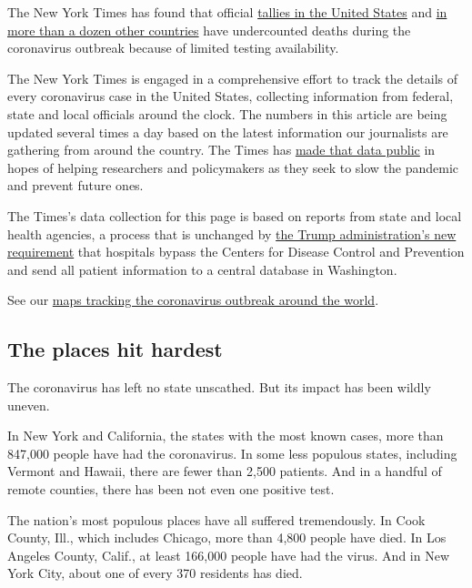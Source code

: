 The New York Times has found that official
\href{https://www.nytimes3xbfgragh.onion/interactive/2020/04/28/us/coronavirus-death-toll-total.html}{tallies
in the United States} and
\href{https://www.nytimes3xbfgragh.onion/interactive/2020/04/21/world/coronavirus-missing-deaths.html}{in
more than a dozen other countries} have undercounted deaths during the
coronavirus outbreak because of limited testing availability.

The New York Times is engaged in a comprehensive effort to track the
details of every coronavirus case in the United States, collecting
information from federal, state and local officials around the clock.
The numbers in this article are being updated several times a day based
on the latest information our journalists are gathering from around the
country. The Times has
\href{https://www.nytimes3xbfgragh.onion/article/coronavirus-county-data-us.html?action=click\&module=Spotlight\&pgtype=Homepage}{made
that data public} in hopes of helping researchers and policymakers as
they seek to slow the pandemic and prevent future ones.

The Times's data collection for this page is based on reports from state
and local health agencies, a process that is unchanged by
\href{https://www.nytimes3xbfgragh.onion/2020/07/14/us/politics/trump-cdc-coronavirus.html}{the
Trump administration's new requirement} that hospitals bypass the
Centers for Disease Control and Prevention and send all patient
information to a central database in Washington.

See our
\href{https://www.nytimes3xbfgragh.onion/interactive/2020/world/coronavirus-maps.html}{maps
tracking the coronavirus outbreak around the world}.

\hypertarget{the-places-hit-hardest}{%
\subsection{The places hit hardest}\label{the-places-hit-hardest}}

The coronavirus has left no state unscathed. But its impact has been
wildly uneven.

In New York and California, the states with the most known cases, more
than 847,000 people have had the coronavirus. In some less populous
states, including Vermont and Hawaii, there are fewer than 2,500
patients. And in a handful of remote counties, there has been not even
one positive test.

The nation's most populous places have all suffered tremendously. In
Cook County, Ill., which includes Chicago, more than 4,800 people have
died. In Los Angeles County, Calif., at least 166,000 people have had
the virus. And in New York City, about one of every 370 residents has
died.

